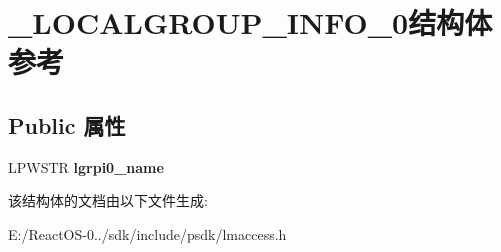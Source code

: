 \hypertarget{struct___l_o_c_a_l_g_r_o_u_p___i_n_f_o__0}{}\section{\+\_\+\+L\+O\+C\+A\+L\+G\+R\+O\+U\+P\+\_\+\+I\+N\+F\+O\+\_\+0结构体 参考}
\label{struct___l_o_c_a_l_g_r_o_u_p___i_n_f_o__0}
\subsection*{Public 属性}
\begin{DoxyCompactItemize}
\item 
\mbox{\label{struct___l_o_c_a_l_g_r_o_u_p___i_n_f_o__0_a81d14752c99938832d03972e851e97d6}} 
L\+P\+W\+S\+TR {\bfseries lgrpi0\+\_\+name}
\end{DoxyCompactItemize}


该结构体的文档由以下文件生成\+:\begin{DoxyCompactItemize}
\item 
E\+:/\+React\+O\+S-\/0../sdk/include/psdk/lmaccess.\+h\end{DoxyCompactItemize}
